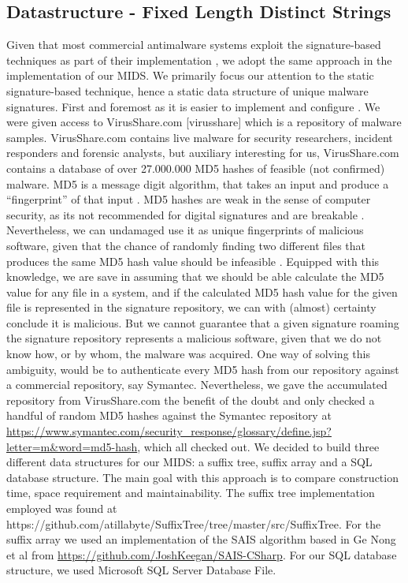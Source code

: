 \documentclass[12pt]{article} %
\begin{document}
\subsection{Datastructure - Fixed Length Distinct Strings}

Given that most commercial antimalware systems exploit the signature-based techniques as part of their implementation \cite{kruegel2003using}, we adopt the same approach in the implementation of our MIDS. We primarily focus our attention to the static signature-based technique, hence a static data structure of unique malware signatures. First and foremost as it is easier to implement and configure \cite{kruegel2003using}.  
We were given access to VirusShare.com  [virusshare] which is a repository of malware samples.  VirusShare.com contains live malware for security researchers, incident responders and forensic analysts, but auxiliary interesting for us, VirusShare.com contains a database of over 27.000.000 MD5 hashes of feasible (not confirmed) malware. MD5 is a message digit algorithm, that takes an input and produce a “fingerprint” of that input \cite{turner2011updated}. MD5 hashes are weak in the sense of computer security, as its not recommended for digital signatures \cite{turner2011updated } and are breakable  \cite{turner2011updated, wang2005break}. Nevertheless, we can undamaged use it as unique fingerprints of malicious software, given that the chance of randomly finding two different files that produces the same MD5 hash value should be infeasible \cite{thompson2005md5}. Equipped with this knowledge, we are save in assuming that we should be able calculate the MD5 value for any file in a system,  and if the calculated MD5 hash value for the given file is represented in the signature repository, we can with (almost) certainty conclude it is malicious. But we cannot guarantee that a given signature roaming the signature repository represents a malicious software, given that we do not know how, or by whom, the malware was acquired. One way of solving this ambiguity, would be to authenticate every MD5 hash from our repository against a commercial repository, say Symantec. Nevertheless, we gave the accumulated repository from VirusShare.com  the benefit of the doubt and only checked a handful of random MD5 hashes against the Symantec repository at \href{https://www.symantec.com/security_response/glossary/define.jsp?letter=m&word=md5-hash}{https://www.symantec.com/security_response/glossary/define.jsp?letter=m&word=md5-hash}, which all checked out.
We decided to build three different data structures for our MIDS: a suffix tree, suffix array and a SQL database structure. The main goal with this approach is to compare construction time, space requirement and maintainability. The suffix tree implementation employed was found at \href{https://github.com/atillabyte/SuffixTree/tree/master/src/SuffixTree}\\
{https://github.com/atillabyte/SuffixTree/tree/master/src/SuffixTree}. For the suffix array we used an implementation of the SAIS algorithm based in Ge Nong et al \cite{twoeffecient} from \href{https://github.com/JoshKeegan/SAIS-CSharp}{https://github.com/JoshKeegan/SAIS-CSharp}. For our SQL database structure, we used Microsoft SQL Server Database File.
\end{document}
